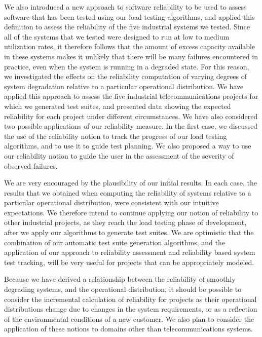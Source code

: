 \documentclass[journal, twoside]{IEEEtran}
\begin{document}
We also introduced a new approach to software reliability to
be used to assess software that has been tested using our load
testing algorithms, and applied this definition to assess the
reliability of the five industrial systems we tested. Since all of
the systems that we tested were designed to run at low to medium utilization rates, it therefore follows that the amount of
excess capacity available in these systems makes it unlikely
that there will be many failures encountered in practice, even
when the system is running in a degraded state. For this reason,
we investigated the effects on the reliability computation of
varying degrees of system degradation relative to a particular
operational distribution. We have applied this approach to
assess the five industrial telecommunications projects for
which we generated test suites, and presented data showing the
expected reliability for each project under different circumstances. We have also considered two possible applications of
our reliability measure. In the first case, we discussed the use
of the reliability notion to track the progress of our load testing
algorithms, and to use it to guide test planning. We also proposed a way to use our reliability notion to guide the user in
the assessment of the severity of observed failures. 

We are very encouraged by the plausibility of our initial results. In each case, the results that we obtained when computing the reliability of systems relative to a particular operational
distribution, were consistent with our intuitive expectations.
We therefore intend to continue applying our notion of reliability to other industrial projects, as they reach the load testing phase of development, after we apply our algorithms to
generate test suites. We are optimistic that the combination of
our automatic test suite generation algorithms, and the application of our approach to reliability assessment and reliability based system test tracking, will be very useful for projects that
can be appropriately modeled. 

Because we have derived a relationship between the reliability of smoothly degrading systems, and the operational
distribution, it should be possible to consider the incremental
calculation of reliability for projects as their operational distributions change due to changes in the system requirements, or
as a reflection of the environmental conditions of a new customer. We also plan to consider the application of these notions to domains other than telecommunications systems. 
\end{document}
